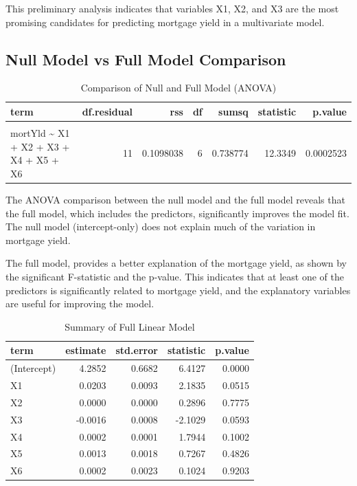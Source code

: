 \documentclass[
  11pt,
]{article}
\begin{document}
This preliminary analysis indicates that variables X1, X2, and X3 are
the most promising candidates for predicting mortgage yield in a
multivariate model.

\subsection{Null Model vs Full Model
Comparison}\label{null-model-vs-full-model-comparison}

\begingroup\fontsize{8}{10}\selectfont

\begin{longtable}[t]{lrrrrrr}
\caption{\label{tab:unnamed-chunk-9}Comparison of Null and Full Model (ANOVA)}\\
\toprule
term & df.residual & rss & df & sumsq & statistic & p.value\\
\midrule
\cellcolor{gray!10}{mortYld \textasciitilde{} 1} & \cellcolor{gray!10}{17} & \cellcolor{gray!10}{0.8485778} & \cellcolor{gray!10}{NA} & \cellcolor{gray!10}{NA} & \cellcolor{gray!10}{NA} & \cellcolor{gray!10}{NA}\\
mortYld \textasciitilde{} X1 + X2 + X3 + X4 + X5 + X6 & 11 & 0.1098038 & 6 & 0.738774 & 12.3349 & 0.0002523\\
\bottomrule
\end{longtable}
\endgroup{}

The ANOVA comparison between the null model and the full model reveals
that the full model, which includes the predictors, significantly
improves the model fit. The null model (intercept-only) does not explain
much of the variation in mortgage yield.

The full model, provides a better explanation of the mortgage yield, as
shown by the significant F-statistic and the p-value. This indicates
that at least one of the predictors is significantly related to mortgage
yield, and the explanatory variables are useful for improving the model.

\begin{table}[!h]
\centering
\caption{\label{tab:unnamed-chunk-10}Summary of Full Linear Model}
\centering
\fontsize{8}{10}\selectfont
\begin{tabular}[t]{lrrrr}
\toprule
term & estimate & std.error & statistic & p.value\\
\midrule
(Intercept) & 4.2852 & 0.6682 & 6.4127 & 0.0000\\
X1 & 0.0203 & 0.0093 & 2.1835 & 0.0515\\
X2 & 0.0000 & 0.0000 & 0.2896 & 0.7775\\
X3 & -0.0016 & 0.0008 & -2.1029 & 0.0593\\
X4 & 0.0002 & 0.0001 & 1.7944 & 0.1002\\
\addlinespace
X5 & 0.0013 & 0.0018 & 0.7267 & 0.4826\\
X6 & 0.0002 & 0.0023 & 0.1024 & 0.9203\\
\bottomrule
\end{tabular}
\end{table}
\end{document}
